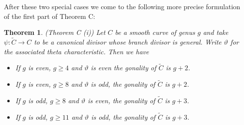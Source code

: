 \documentclass[12pt]{extarticle}
\newtheorem{theorem}{Theorem}
\theoremstyle{definition}
\numberwithin{theorem}{section}
\renewcommand{\tilde}{\widetilde}		%
\begin{document}
After these two special cases we come to the following more precise formulation of the first part of Theorem C:
\begin{theorem}\label{thm:gon_prec}(Theorem C (i))
Let $C$ be a smooth curve of genus $g$ and take $\psi: \tilde{C} \rightarrow C$ to be a canonical divisor whose branch divisor is general. Write $\vartheta$ for the associated theta characteristic. Then we have
\begin{itemize}
\item[(i)] If $g$ is even, $g \geq 4$ and $\vartheta$ is even the gonality of $\tilde{C}$ is $g+2$.
\item[(ii)] If $g$ is even, $g \geq 8$ and $\vartheta$ is odd, the gonality of $\tilde{C}$ is $g+2$.
\item[(iii)] If $g$ is odd, $g \geq 8$ and $\vartheta$ is even, the gonality of $\tilde{C}$ is $g+3$.
\item[(iv)] If $g$ is odd, $g \geq 11$ and $\vartheta$ is odd, the gonality of $\tilde{C}$ is $g+3$.
\end{itemize}
\end{theorem}
\end{document}
